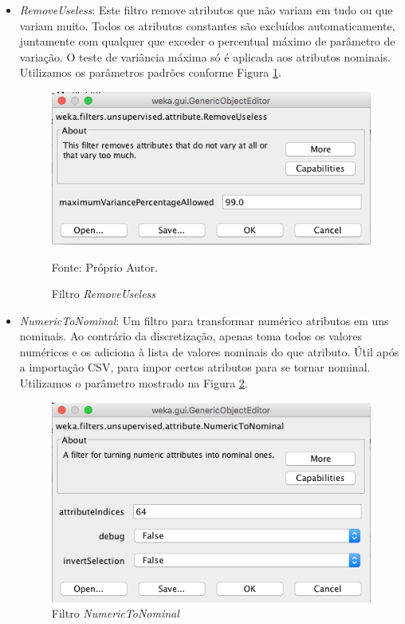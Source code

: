 \documentclass[
	12pt,				%
	openright,			%
	oneside,	
	a4paper,				%
	english,				%
	brazil				%
]{abntex2/abntex2} %
\begin{document}
		\begin{itemize}
			\item \textit{RemoveUseless}: Este filtro remove atributos que não variam em tudo ou que variam muito. Todos os atributos constantes são excluídos automaticamente, juntamente com qualquer que exceder o percentual máximo de parâmetro de variação. O teste de variância máxima só é aplicada aos atributos nominais. Utilizamos os parâmetros padrões conforme Figura \ref{figfiltroRemoveUseless}.
			\begin{figure}[!h]
				\caption{\label{figfiltroRemoveUseless} Filtro \textit{RemoveUseless}}
				\begin{center}
					\includegraphics[scale=0.45]{img/filtroRemoveUseless.png}
				\end{center}
				\centering Fonte: Próprio Autor.
			\end{figure}
			\item \textit{NumericToNominal}: Um filtro para transformar numérico atributos em uns nominais. Ao contrário da discretização, apenas toma todos os valores numéricos e os adiciona à lista de valores nominais do que atributo. Útil após a importação CSV, para impor certos atributos para se tornar nominal. Utilizamos o parâmetro mostrado na Figura \ref{figfiltroNumericToNominal}.
			\begin{figure}[!h]
				\caption{\label{figfiltroNumericToNominal} Filtro \textit{NumericToNominal}}
				\begin{center}
					\includegraphics[scale=0.45]{img/filtroNumericToNominal.png}

\end{center}
\end{figure}
\end{itemize}
\end{document}
